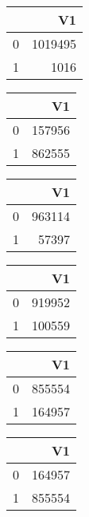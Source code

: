 \bigskip\bigskip
\centering
\begin{tabular}{rr}
  \hline
 & V1 \\ 
  \hline
0 & 1019495 \\ 
  1 & 1016 \\ 
   \hline
\end{tabular}

\bigskip\bigskip
\centering
\begin{tabular}{rr}
  \hline
 & V1 \\ 
  \hline
0 & 157956 \\ 
  1 & 862555 \\ 
   \hline
\end{tabular}

\bigskip\bigskip
\centering
\begin{tabular}{rr}
  \hline
 & V1 \\ 
  \hline
0 & 963114 \\ 
  1 & 57397 \\ 
   \hline
\end{tabular}

\bigskip\bigskip
\centering
\begin{tabular}{rr}
  \hline
 & V1 \\ 
  \hline
0 & 919952 \\ 
  1 & 100559 \\ 
   \hline
\end{tabular}

\bigskip\bigskip
\centering
\begin{tabular}{rr}
  \hline
 & V1 \\ 
  \hline
0 & 855554 \\ 
  1 & 164957 \\ 
   \hline
\end{tabular}

\bigskip\bigskip
\centering
\begin{tabular}{rr}
  \hline
 & V1 \\ 
  \hline
0 & 164957 \\ 
  1 & 855554 \\ 
   \hline
\end{tabular}

